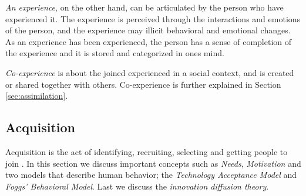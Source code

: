 \textit{An experience}, on the other hand, can be articulated by the person who have experienced it. The experience is perceived through the interactions and emotions of the person, and the experience may illicit behavioral and emotional changes. As an experience has been experienced, the person has a sense of completion of the experience and it is stored and categorized in ones mind.

\textit{Co-experience} is about the joined experienced in a social context, and is created or shared together with others. Co-experience is further explained in Section \ref{sec:assimilation}.

\subsection{Acquisition}
Acquisition is the act of identifying, recruiting, selecting and getting people to join \cite{Bradt2009}. In this section we discuss important concepts such as \textit{Needs}, \textit{Motivation} and two models that describe human behavior; the \textit{Technology Acceptance Model} and \textit{Foggs' Behavioral Model}. Last we discuss the \textit{innovation diffusion theory}.

